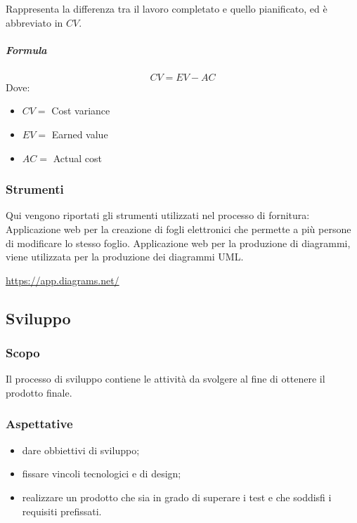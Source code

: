         Rappresenta la differenza tra il lavoro completato e quello pianificato, ed è abbreviato in $CV$.
        \subparagraph{Formula}
        \begin{displaymath}
          CV = EV - AC
        \end{displaymath}
        Dove:
        \begin{itemize}
            \item[] $CV =$ Cost variance
            \item[] $EV =$ Earned value
            \item[] $AC =$ Actual cost
        \end{itemize}
        
		\subsubsection{Strumenti}
	    Qui vengono riportati gli strumenti utilizzati nel processo di fornitura:
	    Applicazione web per la creazione di fogli elettronici che permette a più persone di modificare lo stesso foglio.
	    Applicazione web per la produzione di diagrammi, viene utilizzata per la produzione dei diagrammi UML.\\
	    \centerline{\url{https://app.diagrams.net/}}
			
		\subsection{Sviluppo}
		\subsubsection{Scopo}
		Il processo di sviluppo contiene le attività da svolgere al fine di ottenere il prodotto finale.
		
		\subsubsection{Aspettative}
		\begin{itemize}
			\item dare obbiettivi di sviluppo;
			\item fissare vincoli tecnologici e di design;
			\item realizzare un prodotto che sia in grado di superare i test e che soddisfi i requisiti prefissati.
		\end{itemize}
		
